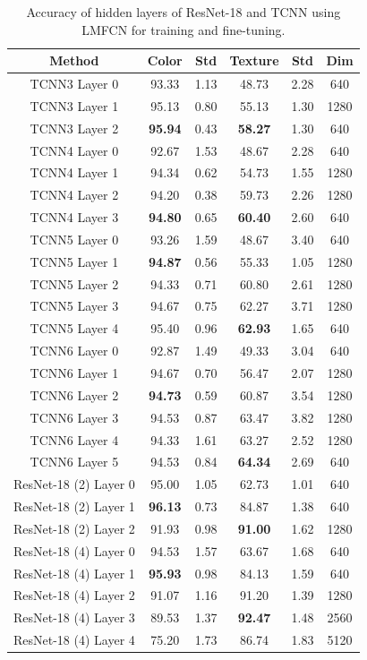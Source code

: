 \documentclass[conference]{IEEEtran}
\begin{document}
\begin{table}[htbp]
\caption{Accuracy of hidden layers of ResNet-18 and TCNN using LMFCN for training and fine-tuning.}
\begin{center}
\begin{tabular}{c|c|c|c|c|c}
\hline
\textbf{Method} & \textbf{Color} & \textbf{Std} & \textbf{Texture} & \textbf{Std} & \textbf{Dim}\\
\hline
TCNN3 Layer 0 & 93.33 & 1.13 & 48.73 & 2.28 & 640 \\
TCNN3 Layer 1 & 95.13 & 0.80 & 55.13 & 1.30 & 1280 \\
TCNN3 Layer 2 & \textbf{95.94} & 0.43 & \textbf{58.27} & 1.30 & 640 \\
TCNN4 Layer 0 & 92.67 & 1.53 & 48.67 & 2.28 & 640 \\
TCNN4 Layer 1 & 94.34 & 0.62 & 54.73 & 1.55 & 1280 \\
TCNN4 Layer 2 & 94.20 & 0.38 & 59.73 & 2.26 & 1280 \\
TCNN4 Layer 3 & \textbf{94.80} & 0.65 & \textbf{60.40} & 2.60 & 640 \\
TCNN5 Layer 0 & 93.26 & 1.59 & 48.67 & 3.40 & 640 \\
TCNN5 Layer 1 & \textbf{94.87} & 0.56 & 55.33 & 1.05 & 1280 \\
TCNN5 Layer 2 & 94.33 & 0.71 & 60.80 & 2.61 & 1280 \\
TCNN5 Layer 3 & 94.67 & 0.75 & 62.27 & 3.71 & 1280 \\
TCNN5 Layer 4 & 95.40 & 0.96 & \textbf{62.93} & 1.65 & 640 \\
TCNN6 Layer 0 & 92.87 & 1.49 & 49.33 & 3.04 & 640 \\
TCNN6 Layer 1 & 94.67 & 0.70 & 56.47 & 2.07 & 1280 \\
TCNN6 Layer 2 & \textbf{94.73} & 0.59 & 60.87 & 3.54 & 1280 \\
TCNN6 Layer 3 & 94.53 & 0.87 & 63.47 & 3.82 & 1280 \\
TCNN6 Layer 4 & 94.33 & 1.61 & 63.27 & 2.52 & 1280 \\
TCNN6 Layer 5 & 94.53 & 0.84 & \textbf{64.34} & 2.69 & 640 \\
ResNet-18 (2) Layer 0 & 95.00 & 1.05 & 62.73 & 1.01 & 640 \\
ResNet-18 (2) Layer 1 & \textbf{96.13} & 0.73 & 84.87 & 1.38 & 640 \\
ResNet-18 (2) Layer 2 & 91.93 & 0.98 & \textbf{91.00} & 1.62 & 1280 \\
ResNet-18 (4) Layer 0 & 94.53 & 1.57 & 63.67 & 1.68 & 640 \\
ResNet-18 (4) Layer 1 & \textbf{95.93} & 0.98 & 84.13 & 1.59 & 640 \\
ResNet-18 (4) Layer 2 & 91.07 & 1.16 & 91.20 & 1.39 & 1280 \\
ResNet-18 (4) Layer 3 & 89.53 & 1.37 & \textbf{92.47} & 1.48 & 2560 \\
ResNet-18 (4) Layer 4 & 75.20 & 1.73 & 86.74 & 1.83 & 5120 \\
\hline
\end{tabular}
\label{tab1}
\end{center}
\end{table}
\end{document}
